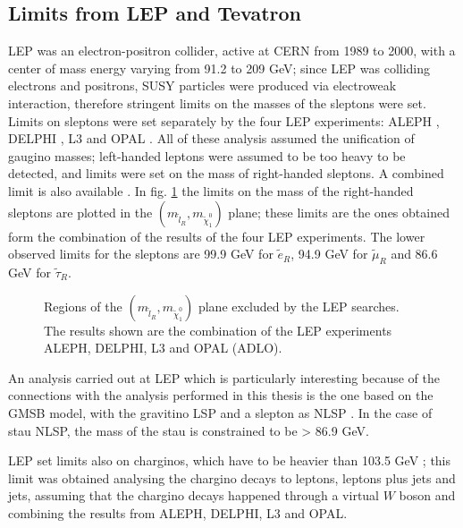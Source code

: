 \subsection{Limits from LEP and Tevatron}
\label{sec:LEPTEVATRONlimits}

LEP was an electron-positron collider, active at CERN from 1989 to 2000, with a center of mass energy varying from 91.2 to 209 GeV; since LEP was colliding electrons and positrons, SUSY particles were produced via electroweak interaction, therefore stringent limits on the masses of the sleptons were set. Limits on sleptons were set separately by the four LEP experiments: ALEPH \cite{aleph:sleptons}, DELPHI \cite{delphi:sleptons}, L3 \cite{L3:sleptons} and OPAL \cite{opal:sleptons}. All of these analysis assumed the unification of gaugino masses; left-handed leptons were assumed to be too heavy to be detected, and limits were set on the mass of right-handed sleptons. A combined limit is also available \cite{LEPWG:sleptons}. In fig. \ref{fig:LEPsleptons} the limits on the mass of the right-handed sleptons are plotted in the $\left( m_{\tilde{l}_R} , m_{\tilde{\chi}_1^0}   \right)$ plane; these limits are the ones obtained form the combination of the results of the four LEP experiments. The lower observed limits for the sleptons are 99.9 GeV for $\tilde{e}_R$, 94.9 GeV for $\tilde{\mu}_R$ and 86.6 GeV for $\tilde{\tau}_R$.

\begin{figure}[h]
\begin{center}
\end{center}
\caption[LEP limits on sleptons masses]{Regions of the $\left( m_{\tilde{l}_R} , m_{\tilde{\chi}_1^0}   \right)$ plane excluded by the LEP searches. The results shown are the combination of the LEP experiments ALEPH, DELPHI, L3 and OPAL (ADLO).}
\label{fig:LEPsleptons}
\end{figure}

An analysis carried out at LEP which is particularly interesting because of the connections with the analysis performed in this thesis is the one based on the GMSB model, with the gravitino LSP and a slepton as NLSP \cite{LEPWG:gmsb}. In the case of stau NLSP, the mass of the stau is constrained to be > 86.9 GeV.

LEP set limits also on charginos, which have to be heavier than 103.5 GeV \cite{LEPWG:chargino}; this limit was obtained analysing the chargino decays to leptons, leptons plus jets and jets, assuming that the chargino decays happened through a virtual $W$ boson and combining the results from ALEPH, DELPHI, L3 and OPAL.

